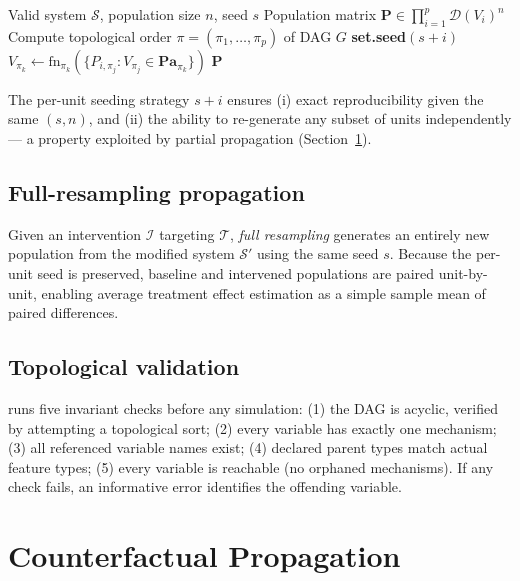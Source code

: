 \documentclass[article]{jss}
\begin{document}
\begin{algorithm}
\caption{Simulate population from system $\mathcal{S}$}
\label{alg:simulate}
\begin{algorithmic}[1]
\Require Valid system $\mathcal{S}$, population size $n$, seed $s$
\Ensure Population matrix $\mathbf{P} \in \prod_{i=1}^p \mathcal{D}(V_i)^n$
\State Compute topological order $\pi = (\pi_1, \ldots, \pi_p)$ of DAG $G$ 
  \State \textbf{set.seed}$(s + i)$ 
    \State $V_{\pi_k} \leftarrow \text{fn}_{\pi_k}\!\left(\{P_{i,\pi_j} : V_{\pi_j} \in \mathbf{Pa}_{\pi_k}\}\right)$
  \EndFor
\EndFor
\State \Return $\mathbf{P}$
\end{algorithmic}
\end{algorithm}

The per-unit seeding strategy $s + i$ ensures (i) exact reproducibility given the same $(s, n)$, and (ii) the ability to re-generate any subset of units independently --- a property exploited by partial propagation (Section~\ref{sec:counterfactual}).

\subsection{Full-resampling propagation}

Given an intervention $\mathcal{I}$ targeting $\mathcal{T}$, \emph{full resampling} generates an entirely new population from the modified system $\mathcal{S}'$ using the same seed $s$. Because the per-unit seed is preserved, baseline and intervened populations are paired unit-by-unit, enabling average treatment effect estimation as a simple sample mean of paired differences.

\subsection{Topological validation}

 runs five invariant checks before any simulation: (1) the DAG is acyclic, verified by attempting a topological sort; (2) every variable has exactly one mechanism; (3) all referenced variable names exist; (4) declared parent types match actual feature types; (5) every variable is reachable (no orphaned mechanisms). If any check fails, an informative error identifies the offending variable.

\section{Counterfactual Propagation}
\label{sec:counterfactual}
\end{document}
